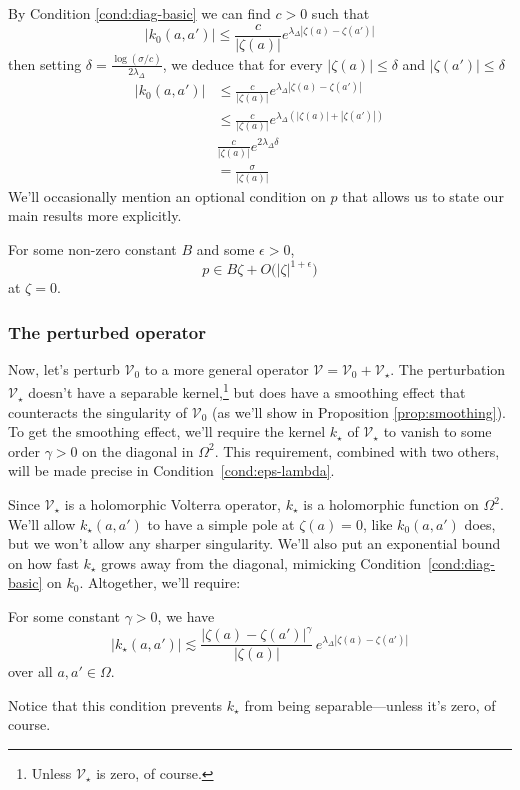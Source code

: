 \documentclass{article}
\makeatletter
\theoremstyle{definition}
\theoremstyle{plain}
\newcommand{\condconst}[2]{\item[($\text{\textsc{#1}} \mid #2$)]\protected@edef\@currentlabel{$\text{\textsc{#1}} \mid #2$}}
\newcommand{\volterra}{\mathcal{V}}
\newcommand{\hardpart}{\mathcal{V}_0}
\newcommand{\softpart}{\mathcal{V}_\star}
\newcommand{\hardker}{k_0}
\newcommand{\softker}{k_\star}
\newcommand{\domain}{\Omega}
\newenvironment{verify}{\color{ForestGreen}}{\color{black}}
\makeatother
\begin{document}
\begin{verify}
    By Condition \eqref{cond:diag-basic} we can find $c>0$ such that \[ | \hardker(a, a') | \le \frac{c}{|\zeta(a)|} e^{\lambda_\Delta|\zeta(a)-\zeta(a')|} \]
then setting $\delta=\frac{\log(\sigma/c)}{2\lambda_\Delta}$, we deduce that for every $|\zeta(a)|\le\delta$ and  $|\zeta(a')|\le\delta$
\begin{align*}
    |\hardker(a,a')|&\le \frac{c}{|\zeta(a)|} e^{\lambda_\Delta|\zeta(a)-\zeta(a')|}\\
    &\le \frac{c}{|\zeta(a)|} e^{\lambda_\Delta(|\zeta(a)|+|\zeta(a')|)}\\
    &\frac{c}{|\zeta(a)|} e^{2\lambda_\Delta \delta}\\
    &=\frac{\sigma}{|\zeta(a)|}
\end{align*}
\end{verify}
\color{black}
We'll occasionally mention an optional condition on $p$ that allows us to state our main results more explicitly.
\begin{conditions}
\condconst{reg-p}{B, \epsilon}\label{cond:reg-p}
For some non-zero constant $B$ and some $\epsilon > 0$,
\[ p \in B\zeta + O\big(|\zeta|^{1 + \epsilon}\big) \]
at $\zeta = 0$.
\end{conditions}
\subsubsection{The perturbed operator}\label{setting:perturbed}

Now, let's perturb $\hardpart$ to a more general operator $\volterra=\hardpart +\softpart$. The perturbation $\softpart$ doesn't have a separable kernel,\footnote{Unless $\softpart$ is zero, of course.} but does have a smoothing effect that counteracts the singularity of $\hardpart$ (as we'll show in Proposition \ref{prop:smoothing}). To get the smoothing effect, we'll require the kernel $\softker$ of $\softpart$ to vanish to some order $\gamma > 0$ on the diagonal in $\domain^2$. This requirement, combined with two others, will be made precise in Condition~\eqref{cond:eps-lambda}.

Since $\softpart$ is a holomorphic Volterra operator, $\softker$ is a holomorphic function on $\domain^2$. We'll allow $\softker(a, a')$ to have a simple pole at $\zeta(a) = 0$, like $\hardker(a, a')$ does, but we won't allow any sharper singularity. We'll also put an exponential bound on how fast $\softker$ grows away from the diagonal, mimicking Condition~\eqref{cond:diag-basic} on $\hardker$. Altogether, we'll require:
\begin{conditions}
\condconst{diag$_\star$}{\gamma, \lambda_\Delta}\label{cond:eps-lambda} For some constant $\gamma > 0$, we have
\[ |\softker(a, a')| \lesssim\frac{|\zeta(a)-\zeta(a')|^\gamma}{|\zeta(a)|}\,e^{\lambda_\Delta|\zeta(a)-\zeta(a')|}\]
over all $a, a' \in \domain$.
\end{conditions}
Notice that this condition prevents $\softker$ from being separable---unless it's zero, of course.
\end{document}
